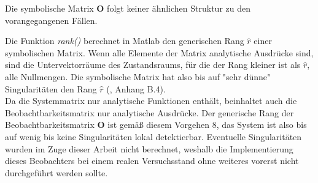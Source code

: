 \documentclass[times, 9pt,twocolumn]{article}
\begin{document}
	Die symbolische Matrix $\bm O$ folgt keiner ähnlichen Struktur zu den vorangegangenen Fällen.  \\

	Die Funktion \textit{rank()} berechnet in Matlab den generischen Rang $\hat r$ einer symbolischen Matrix. Wenn alle Elemente der Matrix analytische Ausdrücke sind, sind die Untervektorräume des Zustandsraums, für die der Rang kleiner ist als $\hat r$, alle Nullmengen. Die symbolische Matrix hat also bis auf "sehr dünne" Singularitäten den Rang $\hat r$ (\cite{ex3}, Anhang B.4). \\
	Da die Systemmatrix nur analytische Funktionen enthält, beinhaltet auch die Beobachtbarkeitsmatrix nur analytische Ausdrücke. 
	Der generische Rang der Beobachtbarkeitsmatrix $\bm O$ ist gemäß diesem Vorgehen 8, das System ist also bis auf wenig bis keine Singularitäten lokal detektierbar. Eventuelle Singularitäten wurden im Zuge dieser Arbeit nicht berechnet, weshalb die Implementierung dieses Beobachters bei einem realen Versuchsstand ohne weiteres vorerst nicht durchgeführt werden sollte. \\
	
\end{document}
